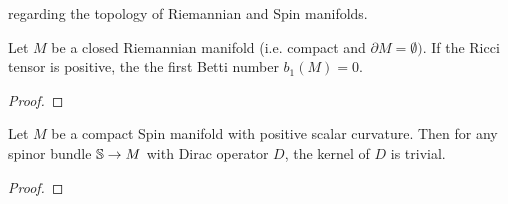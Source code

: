 regarding the topology of Riemannian and Spin manifolds.
%
\begin{thm}
Let $M$ be a closed Riemannian manifold (i.e. compact and $\partial M = \emptyset)$.
If the Ricci tensor is positive, the the first Betti number $b_1(M) = 0$.
\end{thm}
%
\begin{proof} %

\end{proof}
%
\begin{thm}
Let $M$ be a compact Spin manifold with positive scalar curvature. Then for any
spinor bundle $\S \to M$ with Dirac operator $D$, the kernel of $D$ is trivial.
\end{thm}
%
\begin{proof} %

\end{proof}
%